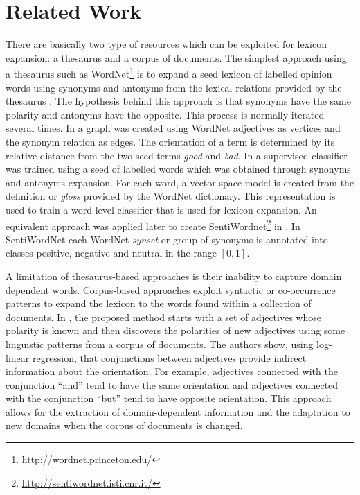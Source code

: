 \documentclass{sig-alternate}
\begin{document}
\section{Related Work}\label{sec:related}
There are basically two type of resources which can be exploited for lexicon expansion: a  thesaurus and a corpus of documents. The simplest approach using a thesaurus such as WordNet\footnote{\url{http://wordnet.princeton.edu/}} is to expand a seed lexicon of labelled opinion words using synonyms and antonyms from the lexical relations provided by the thesaurus 
\cite{Liu2004,Kim2004}. The hypothesis behind this approach is that synonyms have the same polarity and antonyms have the opposite. This process is normally iterated several times.
In \cite{kamps2004} a graph was created using WordNet adjectives as vertices and the synonym relation as edges. The orientation of a term is determined by its relative distance from the two seed terms \emph{good} and \emph{bad}. In \cite{Esuli2005} a supervised classifier was trained using a seed of labelled words which was obtained through synonyms and antonyms expansion. For each word, a vector space model is created from the definition or \emph{gloss} provided by the WordNet dictionary. This representation is used to train a word-level classifier that is used for lexicon expansion. An equivalent approach was applied later to create SentiWordnet\footnote{\url{http://sentiwordnet.isti.cnr.it/}} in \cite{esuli2006, Baccianella2010}. In SentiWordNet each WordNet \emph{synset} or group of synonyms is  annotated into classes positive, negative and neutral in the range $[0,1]$.    

A limitation of thesaurus-based approaches is their inability to capture domain dependent words. Corpus-based approaches exploit syntactic or co-occurrence patterns to expand the lexicon to the words found within a collection of documents. 
In \cite{Hatziva1997}, the proposed method starts with a set of adjectives whose polarity is known and then discovers the polarities of new adjectives using some linguistic patterns from a corpus of documents. The authors show, using log-linear regression, that conjunctions between adjectives provide indirect information about the orientation. For example, adjectives connected with the conjunction ``and'' tend to have the same orientation and adjectives connected with the conjunction ``but'' tend to have opposite orientation. This approach allows for the extraction of domain-dependent information and the adaptation to new domains when the corpus of documents is changed. 
\end{document}
